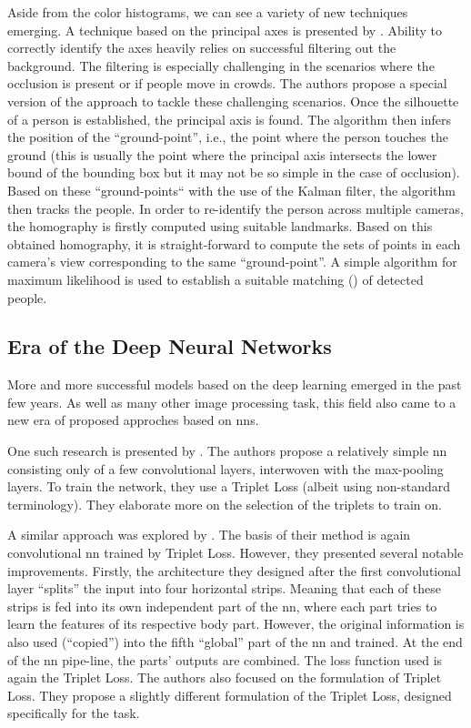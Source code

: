 Aside from the color histograms, we can see a variety of new techniques emerging. A technique based on the principal axes is presented by \cite{hu2006principal}. Ability to correctly identify the axes heavily relies on successful filtering out the background. The filtering is especially challenging in the scenarios where the occlusion is present or if people move in crowds. The authors propose a special version of the approach to tackle these challenging scenarios. Once the silhouette of a person is established, the principal axis is found. The algorithm then infers the position of the ``ground-point'', i.e., the point where the person touches the ground (this is usually the point where the principal axis intersects the lower bound of the bounding box but it may not be so simple in the case of occlusion). Based on these ``ground-points`` with the use of the Kalman filter, the algorithm then tracks the people. In order to re-identify the person across multiple cameras, the homography is firstly computed using suitable landmarks. Based on this obtained homography, it is straight-forward to compute the sets of points in each camera's view corresponding to the same ``ground-point''. A simple algorithm for maximum likelihood is used to establish a suitable matching (\reid{}) of detected people.

\subsection{Era of the Deep Neural Networks}

More and more successful models based on the deep learning emerged in the past few years. As well as many other image processing task, this field also came to a new era of proposed approches based on \glspl{nn}.

One such research is presented by \cite{ding2015deep}. The authors propose a relatively simple \gls{nn} consisting only of a few convolutional layers, interwoven with the max-pooling layers. To train the network, they use a Triplet Loss (albeit using non-standard terminology). They elaborate more on the selection of the triplets to train on.

A similar approach was explored by \cite{cheng2016person}. The basis of their method is again convolutional \gls{nn} trained by Triplet Loss. However, they presented several notable improvements. Firstly, the architecture they designed after the first convolutional layer ``splits'' the input into four horizontal strips. Meaning that each of these strips is fed into its own independent part of the \gls{nn}, where each part tries to learn the features of its respective body part. However, the original information is also used (``copied'') into the fifth ``global'' part of the \gls{nn} and trained. At the end of the \gls{nn} pipe-line, the parts' outputs are combined. The loss function used is again the Triplet Loss. The authors also focused on the formulation of Triplet Loss. They propose a slightly different formulation of the Triplet Loss, designed specifically for the \reid{} task.

